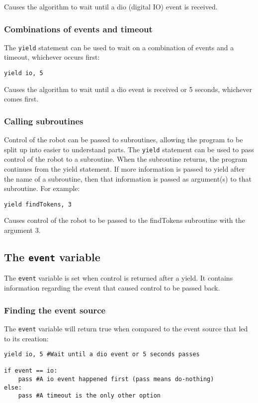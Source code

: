\documentclass{article}
\begin{document}
Causes the algorithm to wait until a dio (digital IO) event is received.

\subsubsection{Combinations of events and timeout}
The \texttt{yield} statement can be used to wait on a combination of events and
a timeout, whichever occurs first:

\begin{verbatim}
yield io, 5
\end{verbatim}

Causes the algorithm to wait until a dio event is received or 5 seconds,
whichever comes first.

\subsubsection{Calling subroutines}
Control of the robot can be passed to subroutines, allowing the program to be
split up into easier to understand parts.  The \texttt{yield} statement can be
used to pass control of the robot to a subroutine.  When the subroutine returns,
the program continues from the yield statement.  If more information is
passed to yield after the name of a subroutine, then that information is passed
as argument(s) to that subroutine.  For example:

\begin{verbatim}
yield findTokens, 3
\end{verbatim}

Causes control of the robot to be passed to the findTokens subroutine with the
argument 3.

\subsection{The \texttt{event} variable}
The \texttt{event} variable is set when control is returned after a
yield. It contains information regarding the event that caused control
to be passed back.

\subsubsection{Finding the event source}
The \texttt{event} variable will return true when compared to the
event source that led to its creation:

\begin{verbatim}
yield io, 5 #Wait until a dio event or 5 seconds passes

if event == io:
    pass #A io event happened first (pass means do-nothing)
else:
    pass #A timeout is the only other option
\end{verbatim}
\end{document}
